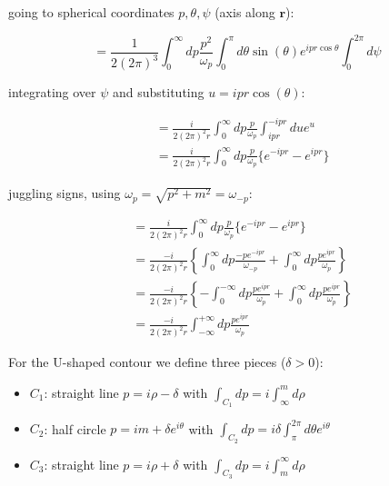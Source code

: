 \documentclass{beamer}
\newcommand{\sqrtpm}{\sqrt{p^2 + m^2}}
\newcommand{\vr}{\mathbf{r}}
\newcommand{\omp}{\omega_{p}}
\newcommand{\ommp}{\omega_{-p}}
\newcommand{\intii}{\int_{-\infty}^{+\infty}}
\begin{document}
\begin{frame}
going to spherical coordinates $p, \theta, \psi$ (axis along $\vr$):

\begin{equation*}
= \frac{1}{2(2\pi)^3} \int_0^\infty dp \frac{p^2}{\omp} \int_0^\pi d\theta \sin(\theta) e^{ipr\cos{\theta}}
\int_0^{2\pi} d\psi
\end{equation*}

integrating over $\psi$ and substituting $u = ipr\cos(\theta)$:

\begin{equation*}
\begin{split}
& = \frac{i}{2(2\pi)^2 r} \int_0^\infty dp \frac{p}{\omp} \int_{ipr}^{-ipr} du e^{u} \\
& = \frac{i}{2(2\pi)^2 r} \int_0^\infty dp \frac{p}{\omp} \big\{ e^{-ipr} - e^{ipr} \big\}
\end{split}
\end{equation*}

\end{frame}


\begin{frame}

juggling signs, using $\omp = \sqrtpm = \ommp$:

\begin{equation*}
\begin{split}
& = \frac{i}{2(2\pi)^2 r} \int_0^\infty dp \frac{p}{\omp} \big\{ e^{-ipr} - e^{ipr} \big\} \\
& = \frac{-i}{2(2\pi)^2 r} \left\{ \int_0^\infty dp \frac{-p e^{-ipr}}{\ommp} + \int_0^\infty dp \frac{p e^{ipr}}{\omp} \right\} \\
& = \frac{-i}{2(2\pi)^2 r} \left\{ -\int_0^{-\infty} dp \frac{p e^{ipr}}{\omp} + \int_0^\infty dp \frac{p e^{ipr}}{\omp} \right\} \\
& = \frac{-i}{2(2\pi)^2 r} \intii dp \frac{p e^{ipr}}{\omp}
\end{split}
\end{equation*}
\end{frame}


\begin{frame}
For the U-shaped contour we define three pieces ($\delta > 0$):
\begin{itemize}
\item $C_1$: straight line $p = i\rho - \delta$ with $\int_{C_1} dp = i \int_\infty^m d\rho$
\item $C_2$: half circle $p = im + \delta e^{i\theta}$ with $\int_{C_2} dp = i\delta \int_\pi^{2\pi} d\theta e^{i\theta}$
\item $C_3$: straight line $p = i\rho + \delta$ with $\int_{C_3} dp = i \int_m^\infty d\rho$
\end{itemize}
\end{frame}
\end{document}

